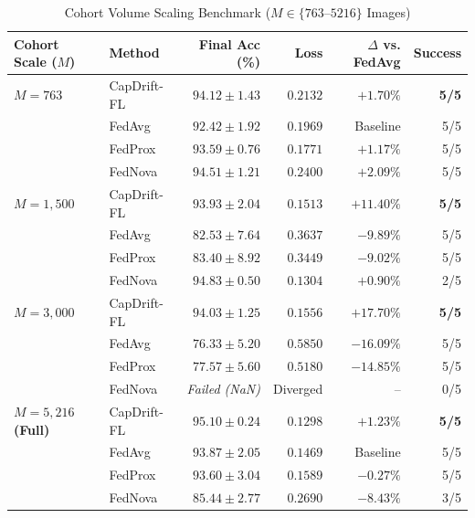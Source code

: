 \documentclass[conference]{IEEEtran}
\begin{document}
\begin{table}[t]
\caption{Cohort Volume Scaling Benchmark ($M \in \{763\text{--}5216\}$ Images)}
\label{tab:dataset_scaling}
\centering\scriptsize
\begin{tabular}{@{}llrrrr@{}}
\toprule
Cohort Scale ($M$) & Method & Final Acc (\%) & Loss & $\Delta$ vs. FedAvg & Success\\
\midrule
\textbf{$M=763$} & CapDrift-FL & $\mathbf{94.12\pm1.43}$ & $\mathbf{0.2132}$ & $\mathbf{+1.70\%}$ & \textbf{5/5}\\
 & FedAvg & $92.42\pm1.92$ & $0.1969$ & Baseline & 5/5\\
 & FedProx & $93.59\pm0.76$ & $0.1771$ & $+1.17\%$ & 5/5\\
 & FedNova & $94.51\pm1.21$ & $0.2400$ & $+2.09\%$ & 5/5\\
\midrule
\textbf{$M=1,500$} & CapDrift-FL & $\mathbf{93.93\pm2.04}$ & $\mathbf{0.1513}$ & $\mathbf{+11.40\%}$ & \textbf{5/5}\\
 & FedAvg & $82.53\pm7.64$ & $0.3637$ & $-9.89\%$ & 5/5\\
 & FedProx & $83.40\pm8.92$ & $0.3449$ & $-9.02\%$ & 5/5\\
 & FedNova & $94.83\pm0.50$ & $0.1304$ & $+0.90\%$ & 2/5\\
\midrule
\textbf{$M=3,000$} & CapDrift-FL & $\mathbf{94.03\pm1.25}$ & $\mathbf{0.1556}$ & $\mathbf{+17.70\%}$ & \textbf{5/5}\\
 & FedAvg & $76.33\pm5.20$ & $0.5850$ & $-16.09\%$ & 5/5\\
 & FedProx & $77.57\pm5.60$ & $0.5180$ & $-14.85\%$ & 5/5\\
 & FedNova & \textit{Failed (NaN)} & Diverged & -- & 0/5\\
\midrule
\textbf{$M=5,216$ (Full)} & CapDrift-FL & $\mathbf{95.10\pm0.24}$ & $\mathbf{0.1298}$ & $\mathbf{+1.23\%}$ & \textbf{5/5}\\
 & FedAvg & $93.87\pm2.05$ & $0.1469$ & Baseline & 5/5\\
 & FedProx & $93.60\pm3.04$ & $0.1589$ & $-0.27\%$ & 5/5\\
 & FedNova & $85.44\pm2.77$ & $0.2690$ & $-8.43\%$ & 3/5\\
\bottomrule
\end{tabular}
\end{table}
\end{document}
